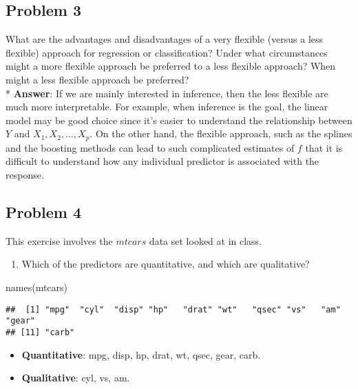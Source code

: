\documentclass[
]{article}
\newenvironment{Shaded}{\begin{snugshade}}{\end{snugshade}}
\newcommand{\FunctionTok}[1]{\textcolor[rgb]{0.00,0.00,0.00}{#1}}
\newcommand{\NormalTok}[1]{#1}
\providecommand{\tightlist}{%
  \setlength{\itemsep}{0pt}\setlength{\parskip}{0pt}}
\begin{document}
\hypertarget{problem-3}{%
\subsection{Problem 3}\label{problem-3}}

What are the advantages and disadvantages of a very flexible (versus a
less flexible) approach for regression or classification? Under what
circumstances might a more flexible approach be preferred to a less
flexible approach? When might a less flexible approach be preferred?\\
* \textbf{Answer}: If we are mainly interested in inference, then the
less flexible are much more interpretable. For example, when inference
is the goal, the linear model may be good choice since it's easier to
understand the relationship between \(Y\) and \(X_1, X_2,...,X_p\). On
the other hand, the flexible approach, such as the splines and the
boosting methods can lead to such complicated estimates of \(f\) that it
is difficult to understand how any individual predictor is associated
with the response.

\hypertarget{problem-4}{%
\subsection{Problem 4}\label{problem-4}}

This exercise involves the \(mtcars\) data set looked at in class.

\begin{enumerate}
\def\labelenumi{(\alph{enumi})}
\tightlist
\item
  Which of the predictors are quantitative, and which are qualitative?
\end{enumerate}

\begin{Shaded}
\begin{Highlighting}[]
\FunctionTok{names}\NormalTok{(mtcars)}
\end{Highlighting}
\end{Shaded}

\begin{verbatim}
##  [1] "mpg"  "cyl"  "disp" "hp"   "drat" "wt"   "qsec" "vs"   "am"   "gear"
## [11] "carb"
\end{verbatim}

\begin{itemize}
\tightlist
\item
  \textbf{Quantitative}: mpg, disp, hp, drat, wt, qsec, gear, carb.
\item
  \textbf{Qualitative}: cyl, vs, am.\\
\end{itemize}
\end{document}
